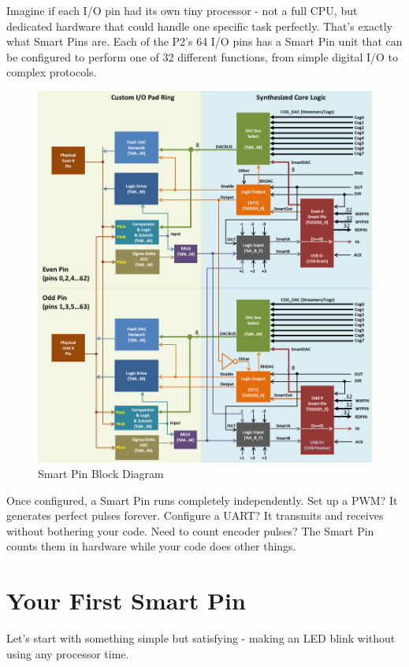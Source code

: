 \documentclass[11pt,a4paper,oneside,english]{book}
\begin{document}
Imagine if each I/O pin had its own tiny processor - not a full CPU, but
dedicated hardware that could handle one specific task perfectly. That's
exactly what Smart Pins are. Each of the P2's 64 I/O pins has a Smart
Pin unit that can be configured to perform one of 32 different
functions, from simple digital I/O to complex protocols.

\begin{figure}
\centering
\includegraphics{assets/smart-pins-master-trimmed.png}
\caption{Smart Pin Block Diagram}
\end{figure}

Once configured, a Smart Pin runs completely independently. Set up a
PWM? It generates perfect pulses forever. Configure a UART? It transmits
and receives without bothering your code. Need to count encoder pulses?
The Smart Pin counts them in hardware while your code does other things.

\hypertarget{your-first-smart-pin}{%
\section{Your First Smart Pin}\label{your-first-smart-pin}}

Let's start with something simple but satisfying - making an LED blink
without using any processor time.
\end{document}
